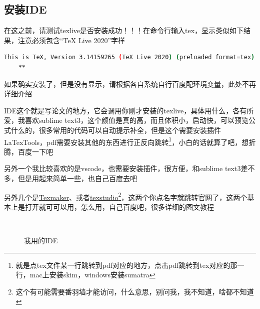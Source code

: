 \documentclass[AutoFakeBold]{LZUThesis2007}
\begin{document}


\subsection{安装IDE} %
\label{sub:安装ide}

在这之前，请测试texlive是否安装成功！！！在命令行输入tex，显示类似如下结果，注意必须包含“TeX Live 2020”字样

\begin{lstlisting}[language=bash]
    This is TeX, Version 3.14159265 (TeX Live 2020) (preloaded format=tex)
    **
\end{lstlisting}


如果确实安装了，但是没有显示，请根据各自系统自行百度配环境变量，此处不再详细介绍


IDE这个就是写论文的地方，它会调用你刚才安装的texlive，具体用什么，各有所爱，我喜欢sublime text3，这个颜值是真的高，而且体积小，启动快，可以预览公式什么的，很多常用的代码可以自动提示补全，但是这个需要安装插件LaTexTools，pdf需要安装其他的东西进行正反向跳转\footnote{就是点tex文件某一行跳转到pdf对应的地方，点击pdf跳转到tex对应的那一行，mac上安装skim，windows安装sumatra}，小白的话就算了吧，想折腾，百度一下吧


另外一个我比较喜欢的是vscode，也需要安装插件，很方便，和sublime text3差不多，但是用起来简单一些，也自己百度去吧

另外几个是\href{https://www.xm1math.net/texmaker}{Texmaker}、或者\href{http://texstudio.sourceforge.net/}{texstudio}\footnote{这个有可能需要番羽墙才能访问，什么意思，别问我，我不知道，啥都不知道}，这两个你点名字就跳转官网了，这两个基本上是打开就可可以用，怎么用，自己百度吧，很多详细的图文教程


\begin{figure}[H]
	\centering
	\qquad
	\\
    \caption{我用的IDE}
    \label{fig_ide}
\end{figure}
\end{document}

